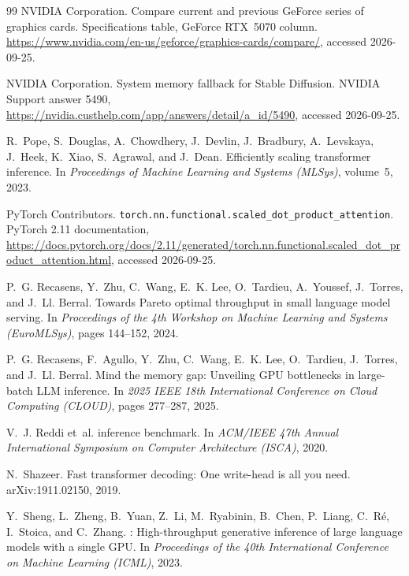 \documentclass[11pt]{article}
\begin{document}
\begin{thebibliography}{99}
NVIDIA Corporation.
\newblock Compare current and previous {GeForce} series of graphics cards.
\newblock Specifications table, {GeForce RTX}~5070 column. \url{https://www.nvidia.com/en-us/geforce/graphics-cards/compare/}, accessed 2026-09-25.

NVIDIA Corporation.
\newblock System memory fallback for {Stable Diffusion}.
\newblock NVIDIA Support answer 5490, \url{https://nvidia.custhelp.com/app/answers/detail/a_id/5490}, accessed 2026-09-25.

R.~Pope, S.~Douglas, A.~Chowdhery, J.~Devlin, J.~Bradbury, A.~Levskaya, J.~Heek, K.~Xiao, S.~Agrawal, and J.~Dean.
\newblock Efficiently scaling transformer inference.
\newblock In {\em Proceedings of Machine Learning and Systems (MLSys)}, volume~5, 2023.

PyTorch Contributors.
\newblock \texttt{torch.\allowbreak nn.\allowbreak functional.\allowbreak scaled\_dot\_product\_attention}.
\newblock PyTorch 2.11 documentation, \url{https://docs.pytorch.org/docs/2.11/generated/torch.nn.functional.scaled_dot_product_attention.html}, accessed 2026-09-25.

P.~G. Recasens, Y.~Zhu, C.~Wang, E.~K. Lee, O.~Tardieu, A.~Youssef, J.~Torres, and J.~Ll. Berral.
\newblock Towards {Pareto} optimal throughput in small language model serving.
\newblock In {\em Proceedings of the 4th Workshop on Machine Learning and Systems (EuroMLSys)}, pages 144--152, 2024.

P.~G. Recasens, F.~Agullo, Y.~Zhu, C.~Wang, E.~K. Lee, O.~Tardieu, J.~Torres, and J.~Ll. Berral.
\newblock Mind the memory gap: Unveiling {GPU} bottlenecks in large-batch {LLM} inference.
\newblock In {\em 2025 IEEE 18th International Conference on Cloud Computing (CLOUD)}, pages 277--287, 2025.

V.~J. Reddi et~al.
 inference benchmark.
\newblock In {\em ACM/IEEE 47th Annual International Symposium on Computer Architecture (ISCA)}, 2020.

N.~Shazeer.
\newblock Fast transformer decoding: One write-head is all you need.
\newblock arXiv:1911.02150, 2019.

Y.~Sheng, L.~Zheng, B.~Yuan, Z.~Li, M.~Ryabinin, B.~Chen, P.~Liang, C.~R{\'e}, I.~Stoica, and C.~Zhang.
: High-throughput generative inference of large language models with a single {GPU}.
\newblock In {\em Proceedings of the 40th International Conference on Machine Learning (ICML)}, 2023.


\end{thebibliography}
\end{document}
